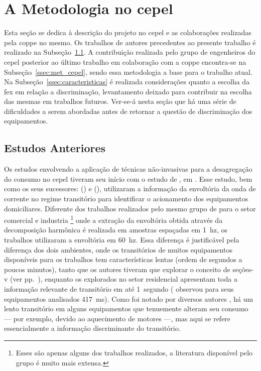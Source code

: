 \section[A Metodologia no CEPEL]{A Metodologia no \acs{cepel}}
\label{sec:nilm_cepel}

Esta seção se dedica à descrição do projeto no \gls{cepel} e as
colaborações realizadas pela \acs{coppe} no mesmo. Os trabalhos de
autores precedentes ao presente trabalho é realizado na
Subseção~\ref{ssec:cepel_anteriores}. A contribuição realizada pelo
grupo de engenheiros do \gls{cepel} posterior ao último trabalho em
colaboração com a \acs{coppe} encontra-se na
Subseção~\ref{ssec:met_cepel}, sendo essa metodologia a base
para o trabalho atual. Na Subseção~\ref{ssec:caracteristicas} é
realizada considerações quanto a escolha da \gls{fex} em relação a
discriminação, levantamento deixado para contribuir na escolha das
mesmas em trabalhos futuros. Ver-se-á nesta seção que há uma série de
dificuldades a serem abordadas antes de retornar a questão de
discriminação dos equipamentos.

\subsection{Estudos Anteriores}
\label{ssec:cepel_anteriores}

Os estudos envolvendo a aplicação de técnicas não-invasivas para a
desagregação do consumo no \gls{cepel} tiveram seu início com o estudo de
\citet*{nilm_cepel_aguiar}, em \citeyear{nilm_cepel_aguiar}. Esse
estudo, bem como os seus sucessores:
\citet{nilm_cepel_bezerra} (\citeyear{nilm_cepel_bezerra}) e 
\citet*{nilm_cepel_alvaro} (\citeyear{nilm_cepel_alvaro}), utilizaram a
informação da envoltória da onda de corrente no regime transitório
para identificar o acionamento dos equipamentos domiciliares. Diferente
dos trabalhos realizados pelo mesmo grupo de
\citeauthor*{nilm_hart_1992_8} para o setor comercial e industria
\cite{nilm_norford_leeb_medianfilt_1996_13,
nilm_leeb_spectral_envelope_1995_23}\footnote{Esses são apenas alguns
dos trabalhos realizados, a literatura disponível pelo grupo é muito
mais extensa.} onde a extração da envoltória obtida através da decomposição
harmônica é realizada em amostras espaçadas em 1~\acs{hz}, os
trabalhos utilizaram a envoltória em 60~\acs{hz}. Essa diferença
é justificável pela diferença dos dois ambientes, onde os transitórios
de muitos equipamentos disponíveis para os trabalhos
\cite{nilm_norford_leeb_medianfilt_1996_13,
nilm_leeb_spectral_envelope_1995_23} tem características lentas (ordem
de segundos a poucos minutos), tanto que os autores tiveram que
explorar o conceito de seções-v (ver
pp.~\pageref{nilm:pot_real_trans}), enquanto os explorados no setor
residencial apresentam toda a informação relevante de
transitório em até 1~segundo (\cite{nilm_cepel_aguiar} observou para
seus equipamentos analisados 417~ms). Como foi notado por diversos autores
\cite{nilm_hart_1992_8,nilm_sultanem_1991_10,
nilm_cole_data_extraction_1998_14,nilm_cole_extra_info_surge_1998_15},
há um lento transitório em alguns equipamentos que tenuemente alteram
seu consumo --- por exemplo, devido ao aquecimento de motores ---, mas
aqui se refere essencialmente a informação discriminante do
transitório.

